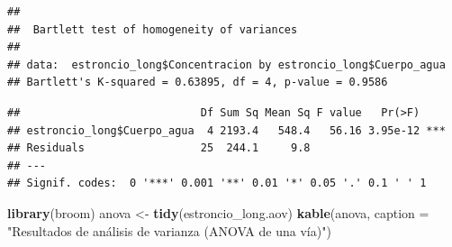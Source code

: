 \documentclass[
]{article}
\newenvironment{Shaded}{\begin{snugshade}}{\end{snugshade}}
\newcommand{\AttributeTok}[1]{\textcolor[rgb]{0.13,0.29,0.53}{#1}}
\newcommand{\FunctionTok}[1]{\textcolor[rgb]{0.13,0.29,0.53}{\textbf{#1}}}
\newcommand{\NormalTok}[1]{#1}
\newcommand{\OtherTok}[1]{\textcolor[rgb]{0.56,0.35,0.01}{#1}}
\newcommand{\SpecialCharTok}[1]{\textcolor[rgb]{0.81,0.36,0.00}{\textbf{#1}}}
\newcommand{\StringTok}[1]{\textcolor[rgb]{0.31,0.60,0.02}{#1}}
\begin{document}
\begin{Shaded}
\end{Shaded}

\begin{verbatim}
## 
##  Bartlett test of homogeneity of variances
## 
## data:  estroncio_long$Concentracion by estroncio_long$Cuerpo_agua
## Bartlett's K-squared = 0.63895, df = 4, p-value = 0.9586
\end{verbatim}

\begin{Shaded}
\end{Shaded}

\begin{verbatim}
##                            Df Sum Sq Mean Sq F value   Pr(>F)    
## estroncio_long$Cuerpo_agua  4 2193.4   548.4   56.16 3.95e-12 ***
## Residuals                  25  244.1     9.8                     
## ---
## Signif. codes:  0 '***' 0.001 '**' 0.01 '*' 0.05 '.' 0.1 ' ' 1
\end{verbatim}

\begin{Shaded}
\begin{Highlighting}[]
\FunctionTok{library}\NormalTok{(broom)}
\NormalTok{anova }\OtherTok{\textless{}{-}} \FunctionTok{tidy}\NormalTok{(estroncio\_long.aov)}
\FunctionTok{kable}\NormalTok{(anova, }\AttributeTok{caption =} \StringTok{"Resultados de análisis de varianza (ANOVA de una vía)"}\NormalTok{)}
\end{Highlighting}
\end{Shaded}
\end{document}
